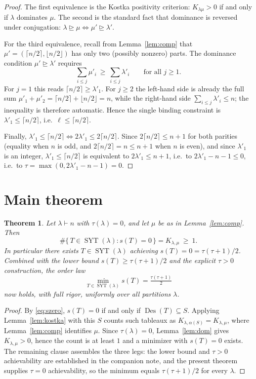 \documentclass[11pt]{article}
\newtheorem{theorem}{Theorem}
\theoremstyle{remark}
\newcommand{\Des}{\operatorname{Des}}
\newcommand{\SYT}{\operatorname{SYT}}
\begin{document}
\begin{proof}
The first equivalence is the Kostka positivity criterion: $K_{\lambda\mu}>0$ if and only if $\lambda$ dominates $\mu$. The second is the standard fact that dominance is reversed under conjugation: $\lambda\trianglerighteq\mu \iff \mu'\trianglerighteq\lambda'$.

For the third equivalence, recall from Lemma~\ref{lem:comp} that $\mu'=(\lceil n/2\rceil,\lfloor n/2\rfloor)$ has only two (possibly nonzero) parts. The dominance condition $\mu'\trianglerighteq\lambda'$ requires
\[
\sum_{i\le j}\mu'_i\ \ge\ \sum_{i\le j}\lambda'_i \qquad\text{for all } j\ge 1 .
\]
For $j=1$ this reads $\lceil n/2\rceil\ge \lambda'_1$. For $j\ge 2$ the left-hand side is already the full sum $\mu'_1+\mu'_2=\lceil n/2\rceil+\lfloor n/2\rfloor=n$, while the right-hand side $\sum_{i\le j}\lambda'_i\le n$; the inequality is therefore automatic. Hence the single binding constraint is $\lambda'_1\le\lceil n/2\rceil$, i.e.\ $\ell\le\lceil n/2\rceil$.

Finally, $\lambda'_1\le\lceil n/2\rceil \iff 2\lambda'_1\le 2\lceil n/2\rceil$. Since $2\lceil n/2\rceil\le n+1$ for both parities (equality when $n$ is odd, and $2\lceil n/2\rceil=n\le n+1$ when $n$ is even), and since $\lambda'_1$ is an integer, $\lambda'_1\le\lceil n/2\rceil$ is equivalent to $2\lambda'_1\le n+1$, i.e.\ to $2\lambda'_1-n-1\le 0$, i.e.\ to $\tau=\max(0,2\lambda'_1-n-1)=0$.
\end{proof}

\section{Main theorem}

\begin{theorem}\label{thm:main}
Let $\lambda\vdash n$ with $\tau(\lambda)=0$, and let $\mu$ be as in Lemma~\ref{lem:comp}. Then
\[
\#\{\,T\in\SYT(\lambda): s(T)=0\,\} = K_{\lambda,\mu}\ \ge\ 1 .
\]
In particular there exists $T\in\SYT(\lambda)$ achieving $s(T)=0=\tau(\tau+1)/2$. Combined with the lower bound $s(T)\ge\tau(\tau+1)/2$ and the explicit $\tau>0$ construction, the order law
\[
\min_{T\in\SYT(\lambda)} s(T)=\tfrac{\tau(\tau+1)}{2}
\]
now holds, with full rigor, uniformly over all partitions $\lambda$.
\end{theorem}

\begin{proof}
By \eqref{eq:szero}, $s(T)=0$ if and only if $\Des(T)\subseteq S$. Applying Lemma~\ref{lem:kostka} with this $S$ counts such tableaux as $K_{\lambda,\alpha(S)}=K_{\lambda,\mu}$, where Lemma~\ref{lem:comp} identifies $\mu$. Since $\tau(\lambda)=0$, Lemma~\ref{lem:dom} gives $K_{\lambda,\mu}>0$, hence the count is at least $1$ and a minimizer with $s(T)=0$ exists. The remaining clause assembles the three legs: the lower bound and $\tau>0$ achievability are established in the companion note, and the present theorem supplies $\tau=0$ achievability, so the minimum equals $\tau(\tau+1)/2$ for every $\lambda$.
\end{proof}
\end{document}

